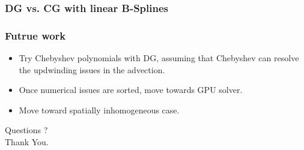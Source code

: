 \documentclass[mathserif, aspectratio=169]{beamer}
\begin{document}
\begin{frame}
	\frametitle{DG vs. CG with linear B-Splines}
\end{frame}

\begin{frame}
	\frametitle{Futrue work}
	\begin{itemize}
		\item Try Chebyshev polynomials with DG, assuming that Chebyshev can resolve the updwinding issues in the advection. 
		\item Once numerical issues are sorted, move towards GPU solver. 
		\item Move toward spatially inhomogeneous case. 
	\end{itemize}
\end{frame}

\begin{frame}
	\begin{center}
		\onslide<+->\Large Questions ? \\
		\onslide<+>\Large Thank You. 
	\end{center}
\end{frame}
\end{document}
